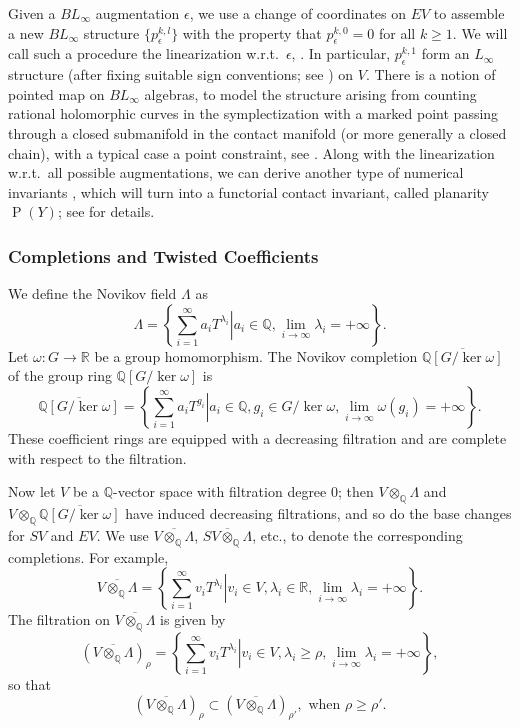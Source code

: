 \documentclass[11pt]{amsart}
\numberwithin{equation}{section}
\def\R{\mathbb{R}}
\def\Q{{\mathbb Q}}
\DeclareMathOperator{\Pl}{P}
\begin{document}
Given a $BL_\infty$ augmentation $\epsilon$, we use a change of coordinates on $EV$ to assemble a new $BL_\infty$ structure $\{p^{k,l}_{\epsilon}\}$ with the property that $p^{k,0}_\epsilon =0$ for all $k\ge 1$. We will call such a procedure the linearization w.r.t.\ $\epsilon$, \cite[Propositions 2.17, 2.18]{moreno2024landscape}. In particular, $p^{k,1}_{\epsilon}$ form an $L_\infty$ structure (after fixing suitable sign conventions; see \cite[\S 2.1, 2.2]{moreno2024landscape}) on $V$. There is a notion of pointed map on $BL_\infty$ algebras, to model the structure arising from counting rational holomorphic curves in the symplectization with a marked point passing through a closed submanifold in the contact manifold (or more generally a closed chain), with a typical case a point constraint, see \cite[Definition 2.19]{moreno2024landscape}. Along with the linearization w.r.t.\ all possible augmentations, we can derive another type of numerical invariants \cite[Definition 2.21]{moreno2024landscape}, which will turn into a functorial contact invariant, called planarity $\Pl(Y)$; see \cite[\S 3.5]{moreno2024landscape} for details. 

\subsubsection{Completions and Twisted Coefficients}
We define the Novikov field $\Lambda$ as
    $$\Lambda=\left\{ \sum_{i=1}^\infty a_i T^{\lambda_i}\left| a_i\in \Q, \displaystyle \lim_{i\to \infty} \lambda_i = +\infty \right.\right\}.$$
Let $\omega:G\to \R $ be a group homomorphism. The Novikov completion $\overline{\Q[G/\ker \omega]}$ of the group ring $\Q[G/\ker \omega]$ is
    $$\overline{\Q[G/\ker \omega ]}=\left\{ \sum_{i=1}^\infty a_i T^{g_i}\left| a_i\in \Q, g_i\in G/\ker \omega, \displaystyle \lim_{i\to \infty} \omega(g_i) = +\infty \right.\right\}.$$
These coefficient rings are equipped with a decreasing filtration and are complete with respect to the filtration.


Now let $V$ be a $\Q$-vector space with filtration degree $0$; then $V\otimes_{\Q} \Lambda$ and $V\otimes_{\Q} \overline{\Q[G/\ker \omega]}$ have induced decreasing filtrations, and so do the base changes for $SV$ and $EV$. We use $\overline{V\otimes_{\Q} \Lambda}$, $\overline{SV\otimes_{\Q} \Lambda}$, etc., to denote the corresponding completions. For example,
$$\overline{V\otimes_{\Q}\Lambda}=\left\{ \sum_{i=1}^{\infty} v_iT^{\lambda_i}\left|v_i\in V,\lambda_i\in \R, \lim_{i\to \infty} \lambda_i=+\infty \right. \right\}.$$
The filtration on $\overline{V\otimes_{\Q}\Lambda}$ is given by
$$(\overline{V\otimes_{\Q}\Lambda})_{\rho}=\left\{ \sum_{i=1}^{\infty} v_iT^{\lambda_i}\left|v_i\in V,\lambda_i\ge \rho, \lim_{i\to \infty} \lambda_i=+\infty \right. \right\},$$
so that
$$(\overline{V\otimes_{\Q}\Lambda})_{\rho} \subset (\overline{V\otimes_{\Q}\Lambda})_{\rho'}, \text{ when } \rho\ge \rho'.$$
\end{document}
